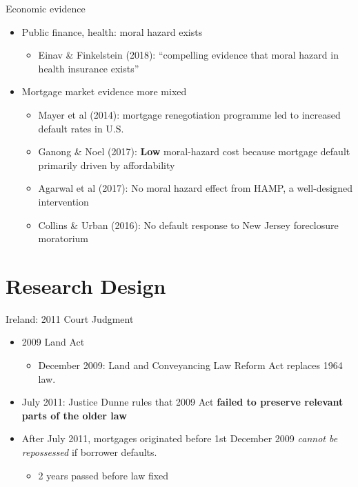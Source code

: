 \documentclass[ignorenonframetext,aspectratio=169]{beamer}
\providecommand{\tightlist}{%
  \setlength{\itemsep}{0pt}\setlength{\parskip}{0pt}}
\begin{document}
\begin{frame}{Economic evidence}

\begin{itemize}
\tightlist
\item
  Public finance, health: moral hazard exists

  \begin{itemize}
  \tightlist
  \item
    Einav \& Finkelstein (2018): ``compelling evidence that moral hazard
    in health insurance exists''
  \end{itemize}
\item
  Mortgage market evidence more mixed

  \begin{itemize}
  \tightlist
  \item
    Mayer et al (2014): mortgage renegotiation programme led to
    increased default rates in U.S.
  \item
    Ganong \& Noel (2017): \textbf{Low} moral-hazard cost because
    mortgage default primarily driven by affordability
  \item
    Agarwal et al (2017): No moral hazard effect from HAMP, a
    well-designed intervention
  \item
    Collins \& Urban (2016): No default response to New Jersey
    foreclosure moratorium
  \end{itemize}
\end{itemize}

\end{frame}

\section{Research Design}\label{research-design}

\begin{frame}{Ireland: 2011 Court Judgment}

\begin{itemize}
\item
  2009 Land Act

  \begin{itemize}
  \tightlist
  \item
    December 2009: Land and Conveyancing Law Reform Act replaces 1964
    law.
  \end{itemize}
\item
  July 2011: Justice Dunne rules that 2009 Act \textbf{failed to
  preserve relevant parts of the older law}
\item
  After July 2011, mortgages originated before 1st December 2009
  \emph{cannot be repossessed} if borrower defaults.

  \begin{itemize}
  \tightlist
  \item
    2 years passed before law fixed
  \end{itemize}
\end{itemize}

\end{frame}
\end{document}
